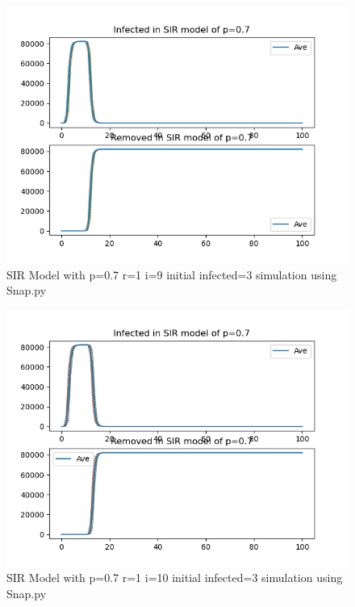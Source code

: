 \documentclass{subfile}
\begin{document}
  \begin{figure}
  \includegraphics[scale=0.8]{sirp07r1i9s3}
  \caption[SIR p=0.7,r=1,i=9,init infected=3]{SIR Model with p=0.7 r=1 i=9 initial infected=3 simulation using Snap.py}
  \end{figure}
  \begin{figure}
  \includegraphics[scale=0.8]{sirp07r1i10s3}
  \caption[SIR p=0.7,r=1,i=10,init infected=3]{SIR Model with p=0.7 r=1 i=10 initial infected=3 simulation using Snap.py}
  \end{figure}
\end{document}
